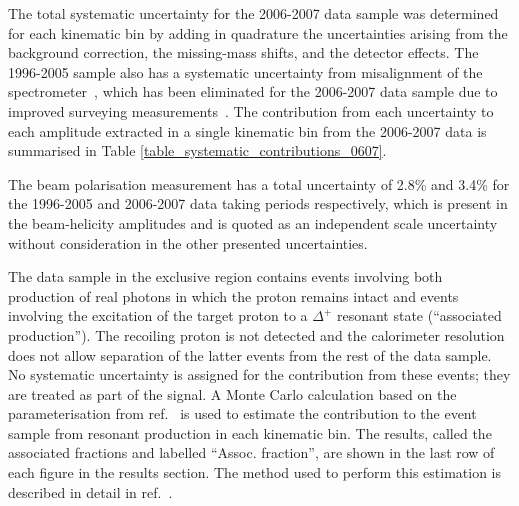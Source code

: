 The total systematic uncertainty for the 2006-2007 data sample was
determined for each kinematic bin by adding in quadrature the
  uncertainties arising from the background correction, the
  missing-mass shifts, and the detector effects.  The 1996-2005 sample also has a
systematic uncertainty from misalignment of the
spectrometer~\cite{Air09}, which has been eliminated for the 2006-2007 data sample due to improved
  surveying measurements~\cite{Bur10}. The contribution from
each uncertainty to each amplitude extracted in a single kinematic bin
from the 2006-2007 data  is summarised in Table
\ref{table_systematic_contributions_0607}.

The beam polarisation measurement has a total uncertainty of 2.8\% and 3.4\% for the 1996-2005 and 2006-2007 data taking periods respectively,
which is present in the beam-helicity amplitudes and is quoted as an
independent scale uncertainty without consideration in the other presented uncertainties.

The data sample in the exclusive region contains events involving both
production of real photons in which the proton remains intact and
events involving the excitation of the target proton to a $\Delta^+$
resonant state (``associated production''). The recoiling proton is not detected and
  the calorimeter resolution does not allow separation of the latter events from the rest of the data sample.
No systematic uncertainty is assigned for the contribution from these
events; they are treated as part of the signal. A Monte Carlo
calculation based on the parameterisation from ref.~\cite{Bra76} is
used to estimate the contribution to the event sample from resonant
production in each kinematic bin. The results, called the associated fractions and labelled ``Assoc. fraction'', are shown in the last row of each figure in the results section. The method used to perform this estimation is described in detail in
ref.~\cite{Air08}.

